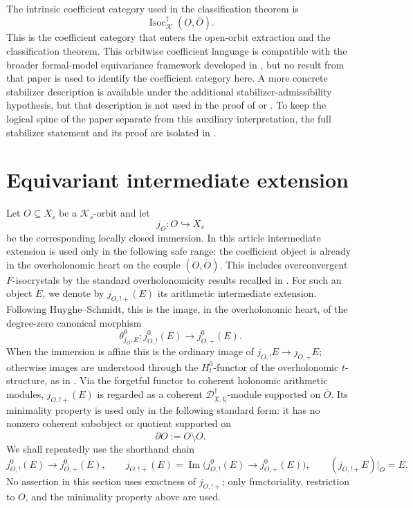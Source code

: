 \documentclass[11pt]{amsart}
\theoremstyle{plain}
\theoremstyle{definition}
\theoremstyle{remark}
\newcommand{\Isoc}{\operatorname{Isoc}}
\begin{document}
The intrinsic coefficient category used in the classification theorem is
\[
  \Isoc^\dagger_{\mathcal K}(O,\overline O).
\]
This is the coefficient category that enters the open-orbit extraction and the
classification theorem.  This orbitwise coefficient language is compatible with
the broader formal-model equivariance framework developed in
\cite{SarrazolaRendiconti}, but no result from that paper is used to identify
the coefficient category here.  A more concrete stabilizer description is available
under the additional stabilizer-admissibility hypothesis, but that description
is not used in the proof of  or
.  To keep the logical spine of the paper
separate from this auxiliary interpretation, the full stabilizer statement and
its proof are isolated in .

\section{Equivariant intermediate extension}
\label{sec:intermediate-extension}

Let \(O\subseteq X_s\) be a \(\mathcal K_s\)-orbit and let
\[
  j_O:O\hookrightarrow X_s
\]
be the corresponding locally closed immersion. In this article intermediate
extension is used only in the following safe range: the coefficient object is
already in the overholonomic heart on the couple \((O,\overline O)\). This
includes overconvergent \(F\)-isocrystals by the standard overholonomicity
results recalled in . For such an object \(E\), we
denote by \(j_{O,!+}(E)\) its arithmetic intermediate extension. Following
Huyghe--Schmidt, this is the image, in the overholonomic heart, of the
degree-zero canonical morphism
\[
  \theta^0_{j_O,E}:j^0_{O,!}(E)\longrightarrow j^0_{O,+}(E).
\]
When the immersion is affine this is the ordinary image of
\(j_{O,!}E\to j_{O,+}E\); otherwise images are understood through the
\(H^0_t\)-functor of the overholonomic \(t\)-structure, as in
\cite[\S2.2]{HuygheSchmidtIntermediate}. Via the forgetful functor to coherent
holonomic arithmetic modules, \(j_{O,!+}(E)\) is regarded as a coherent
\(\mathscr D^\dagger_{\mathfrak X,\mathbb Q}\)-module supported on
\(\overline O\). Its minimality property is used only in the following
standard form: it has no nonzero coherent subobject or quotient supported on
\[
  \partial O:=\overline O\setminus O.
\]
We shall repeatedly use the shorthand chain
\begin{equation}
\label{eq:middle-extension-image-chain}
  j^0_{O,!}(E)\longrightarrow j^0_{O,+}(E),
  \qquad
  j_{O,!+}(E)=
  \operatorname{Im}\bigl(j^0_{O,!}(E)\to j^0_{O,+}(E)\bigr),
  \qquad
  (j_{O,!+}E)|_O=E.
\end{equation}
No assertion in this section uses exactness of \(j_{O,!+}\); only
functoriality, restriction to \(O\), and the minimality property above are used.
\end{document}
